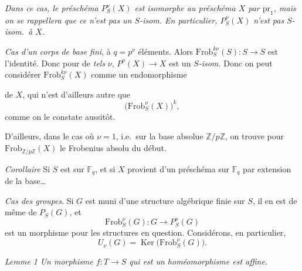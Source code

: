 \documentclass[11pt,a4paper]{article}
\begin{document}
\emph{Dans ce cas, le préschéma $P^{\nu}_S(X)$ est isomorphe au préschéma $X$
par $\mathrm{pr}_1$, mais on se rappellera que ce n'est pas un $S$-isom.
En particulier, $P^{\nu}_S(X)$ n'est pas $S$-isom.\ à $X$.}

\emph{Cas d'un corps de base fini}, à $q = p^{\nu}$ \struck{\ill{}} éléments.
Alors $\mathrm{Frob}^{k\nu}_S(S) : S \to S$ est l'identité. Donc pour de
\emph{tels} $\nu$, \struck{\ill{} \ill{}} $P^{\nu}(X) \to X$ est un
\emph{$S$-isom.} Donc on peut considérer $\mathrm{Frob}^{k\nu}_S(X)$ comme un
endomorphisme



de $X$, qui n'est d'ailleurs autre que
\[
  \bigl(\mathrm{Frob}^{\nu}_S(X)\bigr)^{k} ,
\]
comme on le constate aussitôt.

D'ailleurs, dans le cas où $\nu = 1$, i.e.\ sur la base absolue
$\mathbb{Z}/p\mathbb{Z}$, on trouve pour
$\mathrm{Frob}_{\mathbb{Z}/p\mathbb{Z}}(X)$ le Frobenius absolu du début.

\emph{Corollaire} Si $S$ est sur $\mathbb{F}_q$, et si $X$ provient d'un
préschéma   sur $\mathbb{F}_q$ par extension de la
base\ldots{}

\emph{Cas des groupes}. Si $G$ est muni d'une structure algébrique finie sur
$S$, il en est de même de $P_S(G)$, et 
\[
  \mathrm{Frob}^{\nu}_S(G) : G \longrightarrow P^{\nu}_S(G)
\]
est un morphisme pour les structures en question. Considérons, en
particulier,
\[
  U_{\nu}(G) = \operatorname{Ker}\bigl(\mathrm{Frob}^{\nu}_S(G)\bigr) .
\]




\emph{Lemme 1} \textit{Un morphisme   $f : T \to S$ qui est un homéomorphisme
 est affine.}
\end{document}
